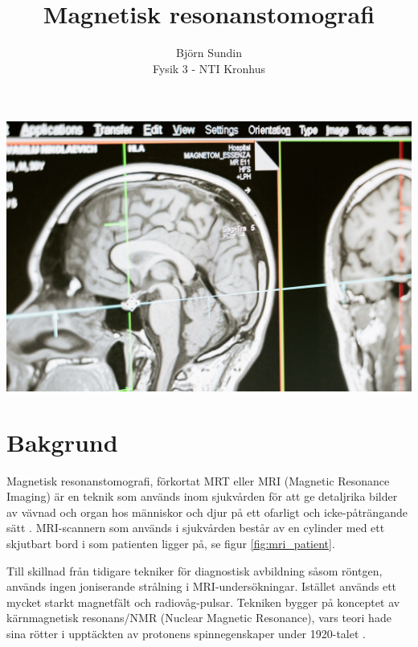 \documentclass[11pt, a4paper]{article}
\title{Magnetisk resonanstomografi}
\author{Björn Sundin\medskip\\\normalsize Fysik 3 - NTI Kronhus}
\begin{document}
\maketitle
\vfill
\includegraphics[width=\textwidth]{mri_scan.jpg}
\vspace{1cm}
\vfill

\clearpage
\section{Bakgrund}

Magnetisk resonanstomografi, förkortat MRT eller MRI (Magnetic Resonance Imaging) är en teknik som används inom sjukvården för att ge detaljrika bilder av vävnad och organ hos människor och djur på ett ofarligt och icke-påträngande sätt \parencite{mri_nobelpris_pressmeddelande}. MRI-scannern som används i sjukvården består av en cylinder med ett skjutbart bord i som patienten ligger på, se figur \ref{fig:mri_patient}. 

Till skillnad från tidigare tekniker för diagnostisk avbildning såsom röntgen, används ingen joniserande strålning i MRI-undersökningar. Istället används ett mycket starkt magnetfält och radiovåg-pulsar. Tekniken bygger på konceptet av kärnmagnetisk resonans/NMR (Nuclear Magnetic Resonance), vars teori hade sina rötter i upptäckten av protonens spinnegenskaper under 1920-talet \parencite{mri_lärobok}.
\end{document}
